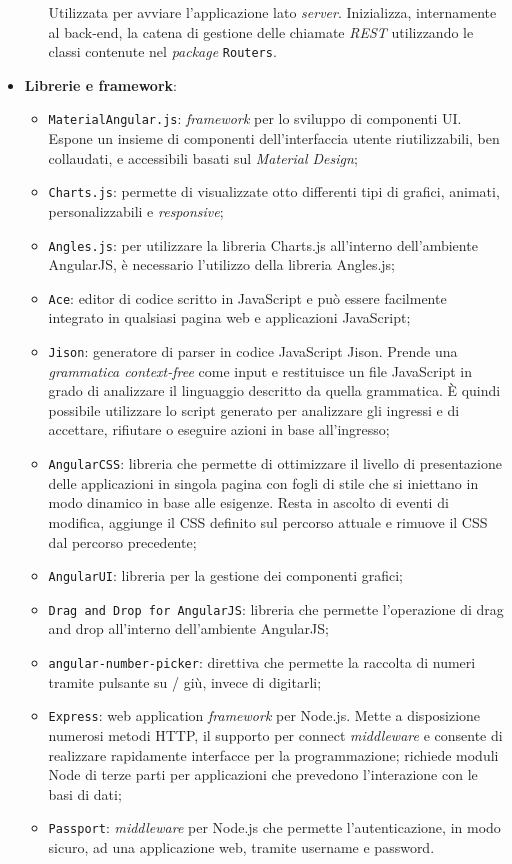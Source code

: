 \begin{itemize}
\begin{itemize}
		Utilizzata per avviare l'applicazione lato \textit{server}. Inizializza, internamente al back-end, la catena di gestione delle chiamate \textit{REST} utilizzando le classi contenute nel \textit{package} \texttt{Routers}.
	\end{itemize}
	\item \textbf{Librerie e framework}:
	\begin{itemize}
		\item \texttt{MaterialAngular.js}: \textit{framework} per lo sviluppo di componenti UI. Espone un insieme di componenti dell'interfaccia utente riutilizzabili, ben collaudati, e accessibili basati sul \textit{Material Design};
		\item \texttt{Charts.js}:  permette di visualizzate otto differenti tipi di grafici, animati, personalizzabili e \textit{responsive};
		\item \texttt{Angles.js}: per utilizzare la libreria Charts.js all'interno dell'ambiente AngularJS, è necessario l'utilizzo della libreria Angles.js;
		\item \texttt{Ace}: editor di codice scritto in JavaScript e può essere facilmente integrato in qualsiasi pagina web e applicazioni JavaScript;
		\item \texttt{Jison}: generatore di parser in codice JavaScript Jison. Prende una \textit{grammatica context-free} come input e restituisce un file JavaScript in grado di analizzare il linguaggio descritto da quella grammatica. È quindi possibile utilizzare lo script generato per analizzare gli ingressi e di accettare, rifiutare o eseguire azioni in base all'ingresso;
		\item \texttt{AngularCSS}: libreria che permette di ottimizzare il livello di presentazione delle applicazioni in singola pagina con fogli di stile che si iniettano in modo dinamico in base alle esigenze. Resta in ascolto di eventi di modifica, aggiunge il CSS definito sul percorso attuale e rimuove il CSS dal percorso precedente;
		\item \texttt{AngularUI}: libreria per la gestione dei componenti grafici;
		\item \texttt{Drag and Drop for AngularJS}: libreria che permette l'operazione di drag and drop all'interno dell'ambiente AngularJS;
		\item \texttt{angular-number-picker}: direttiva che permette la raccolta di numeri tramite pulsante su / giù, invece di digitarli;
		\item \texttt{Express}: web application \textit{framework} per Node.js. Mette a disposizione numerosi metodi HTTP, il supporto per connect \textit{middleware} e consente di realizzare rapidamente interfacce per la programmazione; richiede moduli Node di terze parti per applicazioni che prevedono l'interazione con le basi di dati;
		\item \texttt{Passport}: \textit{middleware} per Node.js che permette l'autenticazione, in modo sicuro, ad una applicazione web, tramite username e password. 
	\end{itemize}
\end{itemize}

